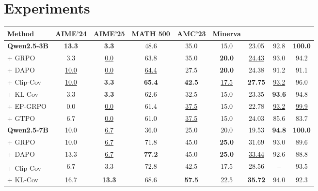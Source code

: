 \documentclass[letterpaper]{article} %
\begin{document}
\section{Experiments}
\label{sec:experiments}
\begin{table}[t]
	\centering
	\small
	\setlength{\tabcolsep}{2.8pt}
	\begin{tabular}{lcccccccc}
		\toprule
		Method & AIME'24 & AIME'25 & MATH 500 & AMC'23 & Minerva
		& \shortstack{Average} & \shortstack{Pass@64} & \shortstack{Mode Retention} \\
		\midrule
		\textbf{Qwen2.5-3B}
		& \textbf{13.3} & \textbf{3.3} & 48.6 & 35.0 & 15.0 & 23.05 & 92.8 & \textbf{100.0} \\
		\quad + GRPO \citep{shao2024deepseekmath}
		& 3.3 & \underline{0.0} & 63.8 & 35.0 & \textbf{20.0} & \underline{24.43} & 93.0 & 94.2 \\
		\quad + DAPO \citep{yu2025dapo}
		& \underline{10.0} & \underline{0.0} & \underline{64.4} & 27.5 & \textbf{20.0} & 24.38 & 91.2 & 91.1 \\
		\quad + Clip-Cov \citep{cui2025entropy}
		& \underline{10.0} & \textbf{3.3} & \textbf{65.4} & \textbf{42.5} & \underline{17.5} & \textbf{27.75} & \underline{93.2} & 96.0 \\
		\quad + KL-Cov \citep{cui2025entropy}
		& 3.3 & \textbf{3.3} & 62.6 & 32.5 & 15.0 & 23.35 & \textbf{93.6} & 94.8 \\
		\quad + EP-GRPO \citep{yu2026epgrpo}
		& 0.0 & \underline{0.0} & 61.4 & \underline{37.5} & 15.0 & 22.78 & \underline{93.2} & \underline{99.9} \\
		\quad + GTPO \citep{simoni2025gtpo}
		& 6.7 & \underline{0.0} & 61.0 & \underline{37.5} & 15.0 & 24.03 & 85.6 & 83.7 \\
		\midrule
		\textbf{Qwen2.5-7B}
		& 10.0 & \underline{6.7} & 36.0 & 25.0 & 20.0 & 19.53 & \textbf{94.8} & \textbf{100.0} \\
		\quad + GRPO \citep{shao2024deepseekmath}
		& 10.0 & \underline{6.7} & 71.8 & 45.0 & \textbf{25.0} & 31.69 & 93.0 & 89.6 \\
		\quad + DAPO \citep{yu2025dapo}
		& 13.3 & \underline{6.7} & \textbf{77.2} & 45.0 & \textbf{25.0} & \underline{33.44} & 92.6 & 88.8 \\
		\quad + Clip-Cov \citep{cui2025entropy}\textsuperscript{}
		& 6.7 & 3.3 & 72.8 & 42.5 & 17.5 & 28.56 & -- & 93.5 \\
		\quad + KL-Cov \citep{cui2025entropy}
		& \underline{16.7} & \textbf{13.3} & 68.6 & \textbf{57.5} & \underline{22.5} & \textbf{35.72} & \underline{94.0} & 92.3 \\

\end{tabular}
\end{table}
\end{document}
